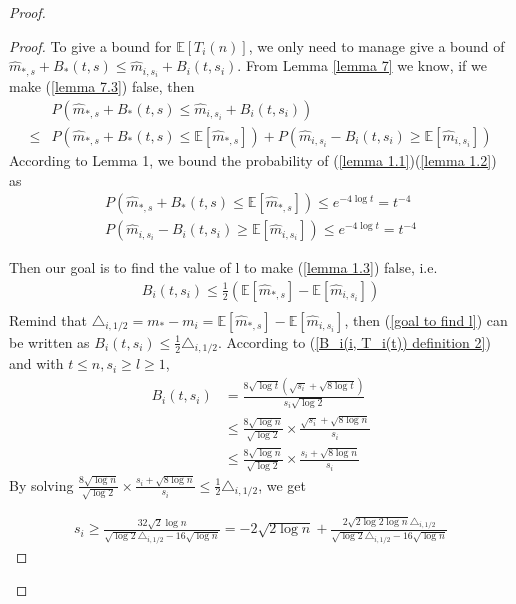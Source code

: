 \documentclass{article}
\theoremstyle{plain}
\begin{document}
\begin{proof}
\begin{proof}
To give a bound for $\mathbb{E}[T_i(n)]$, we only need to manage give a bound of $\hat{m}_{*, s} + B_*(t, s)  \leq \hat{m}_{i, s_i} + B_i(t, s_i)$. From Lemma \ref{lemma 7} we know, if we make (\ref{lemma 7.3}) false, then 
\begin{align}
    & P(\hat{m}_{*, s} + B_*(t, s)  \leq \hat{m}_{i, s_i} + B_i(t, s_i)) \\
    \leq &  P(\hat{m}_{*, s} + B_*(t, s) \leq  \mathbb{E}[\hat{m}_{*, s}]) + P(\hat{m}_{i, s_i} - B_i(t, s_i) \geq \mathbb{E}[\hat{m}_{i, s_i}])
\end{align}
According to Lemma 1, we bound the probability of (\ref{lemma 1.1})(\ref{lemma 1.2}) as
    \begin{align}
        P(\hat{m}_{*, s} + B_*(t, s) \leq  \mathbb{E}[\hat{m}_{*, s}]) \leq  e^{-4\log t} = t^{-4}\\
        P(\hat{m}_{i, s_i} - B_i(t, s_i) \geq \mathbb{E}[\hat{m}_{i, s_i}])  \leq  e^{-4\log t} = t^{-4}
    \end{align}
    
    Then our goal is to find the value of l to make (\ref{lemma 1.3}) false, i.e. 
    \begin{align}
    \label{goal to find l}
        B_i(t, s_i) \leq  \frac{1}{2}(\mathbb{E}[\hat{m}_{*, s}] - \mathbb{E}[\hat{m}_{i, s_i}])\\
    \end{align}
    Remind that $\triangle_{i, 1/2} = m_* - m_i = \mathbb{E}[\hat{m}_{*, s}] - \mathbb{E}[\hat{m}_{i, s_i}]$, then (\ref{goal to find l}) can be written as $B_i(t, s_i) \leq  \frac{1}{2} \triangle_{i, 1/2}$. According to (\ref{B_i(i, T_i(t)) definition 2}) and with $t \leq n, s_i \geq l \geq 1$, 
    \begin{align}
        B_i(t, s_i) &= \frac{8 \sqrt{\log t} (\sqrt{ s_i} + \sqrt{8\log t})}{s_i  \sqrt{\log 2}}\\
        & \leq \frac{8 \sqrt{\log n}}{\sqrt{\log 2}} \times \frac{\sqrt{s_i} + \sqrt{8\log n}}{s_i}\\
        & \leq \frac{8 \sqrt{\log n}}{\sqrt{\log 2}} \times \frac{s_i + \sqrt{8\log n}}{s_i}
    \end{align}
    By solving $\frac{8 \sqrt{\log n}}{\sqrt{\log 2}} \times \frac{s_i + \sqrt{8\log n}}{s_i} \leq \frac{1}{2} \triangle_{i, 1/2}$, we get 
    
    \begin{align}
        s_i \geq \frac{32 \sqrt{2} \log n}{\sqrt{\log 2} \triangle_{i, 1/2} - 16 \sqrt{\log n}} = - 2\sqrt{2 \log n} + \frac{2 \sqrt{2 \log2 \log n } \triangle_{i, 1/2}}{\sqrt{\log 2} \triangle_{i, 1/2} - 16 \sqrt{\log n}}
    \end{align}
    

\end{proof}
\end{proof}
\end{document}
